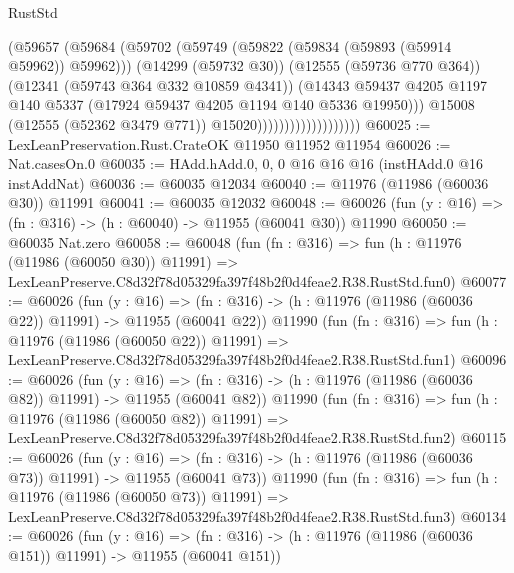 \begin{lexlean}{RustStd}
\begin{coremodule}
                                      (@59657
                                        (@59684
                                          (@59702
                                            (@59749
                                              (@59822 (@59834 (@59893 (@59914 @59962)) @59962)))
                                            (@14299 (@59732 @30))
                                            (@12555 (@59736 @770 @364))
                                            (@12341 (@59743 @364 @332 @10859 @4341))
                                            (@14343
                                              @59437
                                              @4205
                                              @1197
                                              @140
                                              @5337
                                              (@17924 @59437 @4205 @1194 @140 @5336 @19950)))
                                          @15008
                                          (@12555 (@52362 @3479 @771))
                                          @15020)))))))))))))))))))
@60025 := LexLeanPreservation.Rust.CrateOK @11950 @11952 @11954
@60026 := Nat.casesOn.{0}
@60035 := HAdd.hAdd.{0, 0, 0} @16 @16 @16 (instHAdd.{0} @16 instAddNat)
@60036 := @60035 @12034
@60040 := @11976 (@11986 (@60036 @30)) @11991
@60041 := @60035 @12032
@60048 := @60026 (fun (y : @16) => (fn : @316) -> (h : @60040) -> @11955 (@60041 @30)) @11990
@60050 := @60035 Nat.zero
@60058 := @60048
    (fun (fn : @316) =>
    fun (h : @11976 (@11986 (@60050 @30)) @11991) =>
    LexLeanPreserve.C8d32f78d05329fa397f48b2f0d4feae2.R38.RustStd.fun0)
@60077 := @60026
    (fun (y : @16) =>
    (fn : @316) -> (h : @11976 (@11986 (@60036 @22)) @11991) -> @11955 (@60041 @22))
    @11990
    (fun (fn : @316) =>
    fun (h : @11976 (@11986 (@60050 @22)) @11991) =>
    LexLeanPreserve.C8d32f78d05329fa397f48b2f0d4feae2.R38.RustStd.fun1)
@60096 := @60026
    (fun (y : @16) =>
    (fn : @316) -> (h : @11976 (@11986 (@60036 @82)) @11991) -> @11955 (@60041 @82))
    @11990
    (fun (fn : @316) =>
    fun (h : @11976 (@11986 (@60050 @82)) @11991) =>
    LexLeanPreserve.C8d32f78d05329fa397f48b2f0d4feae2.R38.RustStd.fun2)
@60115 := @60026
    (fun (y : @16) =>
    (fn : @316) -> (h : @11976 (@11986 (@60036 @73)) @11991) -> @11955 (@60041 @73))
    @11990
    (fun (fn : @316) =>
    fun (h : @11976 (@11986 (@60050 @73)) @11991) =>
    LexLeanPreserve.C8d32f78d05329fa397f48b2f0d4feae2.R38.RustStd.fun3)
@60134 := @60026
    (fun (y : @16) =>
    (fn : @316) -> (h : @11976 (@11986 (@60036 @151)) @11991) -> @11955 (@60041 @151))

\end{coremodule}
\end{lexlean}
